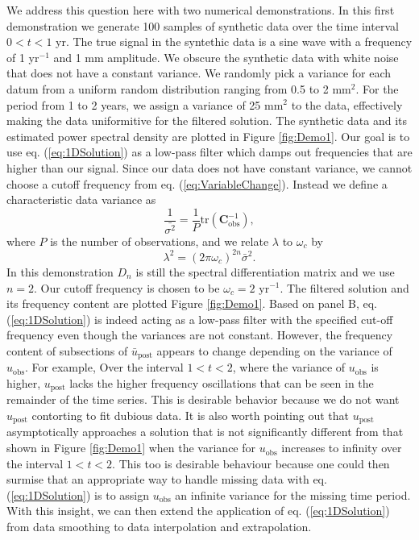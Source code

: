 \documentclass[10pt,a4paper]{article}
\begin{document}
We address this question here with two numerical demonstrations.  In this first demonstration we generate 100 samples of synthetic data over the time interval $0<t<1$ yr.  The true signal in the syntethic data is a sine wave with a frequency of 1 yr$^{-1}$ and 1 mm amplitude.  We obscure the synthetic data with white noise that does not have a constant variance.  We randomly pick a variance for each datum from a uniform random distribution ranging from 0.5 to 2 mm$^2$.  For the period from 1 to 2 years, we assign a variance of 25 mm$^2$ to the data, effectively making the data uniformitive for the filtered solution.  The synthetic data and its estimated power spectral density are plotted in Figure \ref{fig:Demo1}.  Our goal is to use eq. (\ref{eq:1DSolution}) as a low-pass filter which damps out frequencies that are higher than our signal.  Since our data does not have constant variance, we cannot choose a cutoff frequency from eq. (\ref{eq:VariableChange}).  Instead we define a characteristic data variance as
\begin{equation}
\frac{1}{\bar{\sigma^2}} = \frac{1}{P} \mathrm{tr}\left(\mathbf{C}_\mathrm{obs}^{-1}\right),
\end{equation}
where $P$ is the number of observations, and we relate $\lambda$ to $\omega_c$ by
\begin{equation}\label{eq:VariableChange2}
\lambda^2 = (2\pi\omega_c)^{2n}\bar{\sigma}^2.  
\end{equation}
In this demonstration $D_n$ is still the spectral differentiation matrix and we use $n=2$. Our cutoff frequency is chosen to be $\omega_c=2$ yr$^{-1}$.  The filtered solution and its frequency content are plotted Figure \ref{fig:Demo1}. Based on panel B, eq. (\ref{eq:1DSolution}) is indeed acting as a low-pass filter with the specified cut-off frequency even though the variances are not constant.  However, the frequency content of subsections of $\bar{u}_\mathrm{post}$ appears to change depending on the variance of $u_\mathrm{obs}$. For example, Over the interval $1<t<2$, where the variance of $u_\mathrm{obs}$ is higher, $u_\mathrm{post}$ lacks the higher frequency oscillations that can be seen in the remainder of the time series. This is desirable behavior because we do not want $u_\mathrm{post}$ contorting to fit dubious data.  It is also worth pointing out that $u_\mathrm{post}$ asymptotically approaches a solution that is not significantly different from that shown in Figure \ref{fig:Demo1} when the variance for $u_\mathrm{obs}$ increases to infinity over the interval $1<t<2$.  This too is desirable behaviour because one could then surmise that an appropriate way to handle missing data with eq. (\ref{eq:1DSolution}) is to assign $u_\mathrm{obs}$ an infinite variance for the missing time period.  With this insight, we can then extend the application of eq. (\ref{eq:1DSolution}) from data smoothing to data interpolation and extrapolation.   
\end{document}
